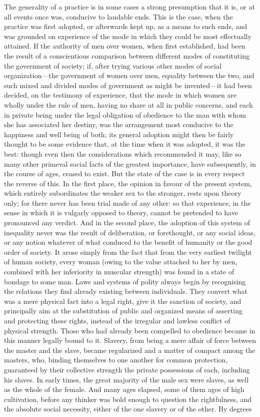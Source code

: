 \documentclass[12pt]{report}
\begin{document}
The generality of a practice is in some cases a strong presumption that it is, or at all events once was, conducive to laudable ends. This is the case, when the practice was first adopted, or afterwards kept up, as a means to such ends, and was grounded on experience of the mode in which they could be most effectually attained. If the authority of men over women, when first established, had been the result of a conscientious comparison between different modes of constituting the government of society; if, after trying various other modes of social organization—the government of women over men, equality between the two, and such mixed and divided modes of government as might be invented—it had been decided, on the testimony of experience, that the mode in which women are wholly under the rule of men, having no share at all in public concerns, and each in private being under the legal obligation of obedience to the man with whom she has associated her destiny, was the arrangement most conducive to the happiness and well being of both; its general adoption might then be fairly thought to be some evidence that, at the time when it was adopted, it was the best: though even then the considerations which recommended it may, like so many other primeval social facts of the greatest importance, have subsequently, in the course of ages, ceased to exist. But the state of the case is in every respect the reverse of this. In the first place, the opinion in favour of the present system, which entirely subordinates the weaker sex to the stronger, rests upon theory only; for there never has been trial made of any other: so that experience, in the sense in which it is vulgarly opposed to theory, cannot be pretended to have pronounced any verdict. And in the second place, the adoption of this system of inequality never was the result of deliberation, or forethought, or any social ideas, or any notion whatever of what conduced to the benefit of humanity or the good order of society. It arose simply from the fact that from the very earliest twilight of human society, every woman (owing to the value attached to her by men, combined with her inferiority in muscular strength) was found in a state of bondage to some man. Laws and systems of polity always begin by recognising the relations they find already existing between individuals. They convert what was a mere physical fact into a legal right, give it the sanction of society, and principally aim at the substitution of public and organized means of asserting and protecting these rights, instead of the irregular and lawless conflict of physical strength. Those who had already been compelled to obedience became in this manner legally bound to it. Slavery, from being a mere affair of force between the master and the slave, became regularized and a matter of compact among the masters, who, binding themselves to one another for common protection, guaranteed by their collective strength the private possessions of each, including his slaves. In early times, the great majority of the male sex were slaves, as well as the whole of the female. And many ages elapsed, some of them ages of high cultivation, before any thinker was bold enough to question the rightfulness, and the absolute social necessity, either of the one slavery or of the other. By degrees 
\end{document}
